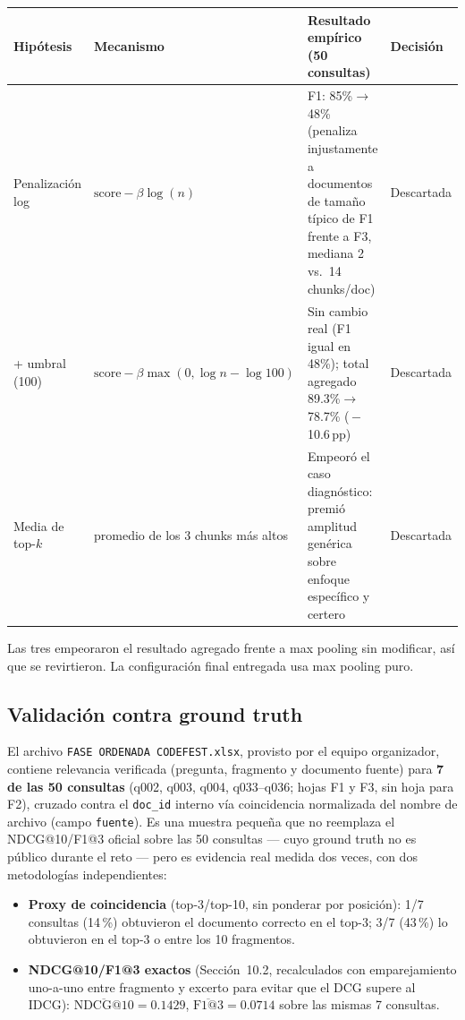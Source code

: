 \documentclass[11pt]{article}
\newcommand{\codigo}[1]{\texttt{\small #1}}
\begin{document}
\begin{center}
\small
\begin{tabular}{@{}p{2.3cm}p{3.1cm}p{6.0cm}p{1.4cm}@{}}
\toprule
\textbf{Hipótesis} & \textbf{Mecanismo} & \textbf{Resultado empírico (50 consultas)} & \textbf{Decisión} \\
\midrule
Penalización log & $\text{score} - \beta\log(n)$ & F1: 85\%$\to$48\% (penaliza injustamente a
documentos de tamaño típico de F1 frente a F3, mediana 2 vs.\ 14 chunks/doc) & Descartada \\
+ umbral (100) & $\text{score} - \beta\max(0,\log n - \log 100)$ & Sin cambio real (F1 igual en 48\%); total agregado 89.3\%$\to$78.7\% (\,$-$10.6\,pp) & Descartada \\
Media de top-$k$ & promedio de los 3 chunks más altos & Empeoró el caso diagnóstico: premió amplitud
genérica sobre enfoque específico y certero & Descartada \\
\bottomrule
\end{tabular}
\end{center}

Las tres empeoraron el resultado agregado frente a max pooling sin
modificar, así que se revirtieron. La configuración final entregada usa max
pooling puro.

\subsection{Validación contra ground truth}

El archivo \codigo{FASE ORDENADA CODEFEST.xlsx}, provisto por el equipo
organizador, contiene relevancia verificada (pregunta, fragmento y documento
fuente) para \textbf{7 de las 50 consultas} (q002, q003, q004, q033--q036;
hojas F1 y F3, sin hoja para F2), cruzado contra el \codigo{doc\_id} interno
vía coincidencia normalizada del nombre de archivo (campo \codigo{fuente}).
Es una muestra pequeña que no reemplaza el NDCG@10/F1@3 oficial sobre las 50
consultas --- cuyo ground truth no es público durante el reto --- pero es
evidencia real medida dos veces, con dos metodologías independientes:

\begin{itemize}
\item \textbf{Proxy de coincidencia} (top-3/top-10, sin ponderar por
posición): 1/7 consultas (14\,\%) obtuvieron el documento correcto en el
top-3; 3/7 (43\,\%) lo obtuvieron en el top-3 o entre los 10 fragmentos.
\item \textbf{NDCG@10/F1@3 exactos} (Sección~10.2, recalculados con
emparejamiento uno-a-uno entre fragmento y excerto para evitar que el DCG
supere al IDCG): $\overline{\text{NDCG@10}} = 0.1429$,
$\overline{\text{F1@3}} = 0.0714$ sobre las mismas 7 consultas.
\end{itemize}
\end{document}
